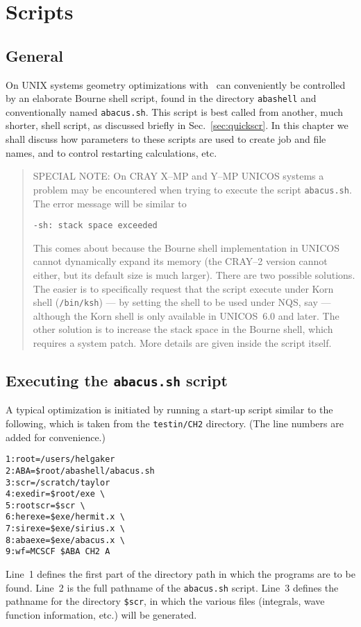 \chapter{Scripts}\label{ch:scripts}

\section{General}

          On UNIX systems geometry optimizations with \siraba\ can
conveniently be controlled by an elaborate Bourne shell script,
found in the directory \verb|abashell| and conventionally named
\verb|abacus.sh|.  This script is best called from another, much
shorter, shell script, as discussed briefly in
Sec.~\ref{sec:quickscr}.  In this chapter we shall discuss how
parameters to these scripts are used to create job and file names,
and to control restarting calculations, etc.
\begin{quote}
SPECIAL NOTE:  On CRAY \mbox{X--MP} and \mbox{Y--MP} UNICOS
systems a problem may be encountered when trying to execute the
script \verb|abacus.sh|.  The error message will be similar to
\begin{verbatim}
-sh: stack space exceeded
\end{verbatim}
This comes about because the Bourne shell implementation in UNICOS
cannot dynamically expand its memory (the \mbox{CRAY--2} version
cannot either, but its default size is much larger).  There are
two possible solutions.  The easier is to specifically request
that the script execute under Korn shell (\verb|/bin/ksh|) --- by
setting the shell to be used under NQS, say --- although the Korn
shell is only available in UNICOS~6.0 and later.  The other
solution is to increase the stack space in the Bourne shell, which
requires a system patch.  More details are given inside the script
itself.
\end{quote}

\section{Executing the {\tt abacus.sh} script}

A typical optimization is initiated by running a start-up script
similar to the following, which is taken from the
\verb|testin/CH2| directory.  (The line numbers are added for
convenience.)
\begin{verbatim}
1:root=/users/helgaker
2:ABA=$root/abashell/abacus.sh
3:scr=/scratch/taylor
4:exedir=$root/exe \ 
5:rootscr=$scr \ 
6:herexe=$exe/hermit.x \ 
7:sirexe=$exe/sirius.x \ 
8:abaexe=$exe/abacus.x \ 
9:wf=MCSCF $ABA CH2 A
\end{verbatim}
Line~1 defines the first part of the directory path in which the
programs are to be found. Line~2 is the
full pathname of the \verb|abacus.sh| script.  Line~3 defines the
pathname for the directory \verb|$scr|, in which the various files
(integrals, wave function information, etc.) will be generated.

